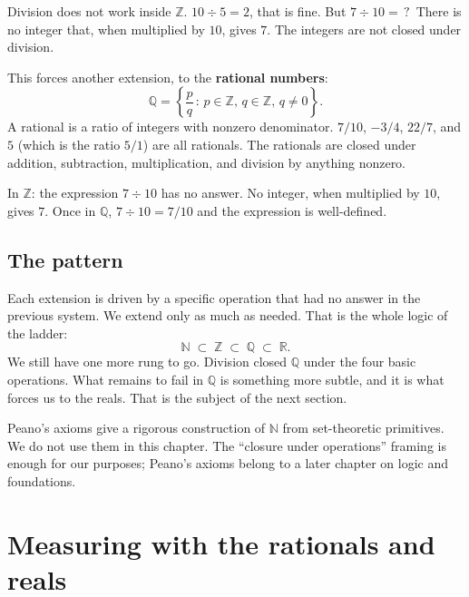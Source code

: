 Division does not work inside $\mathbb{Z}$. $10 \div 5 = 2$, that is fine. But $7 \div 10 = \,?\,$ There is no integer that, when multiplied by $10$, gives $7$. The integers are not closed under division.

This forces another extension, to the \textbf{rational numbers}:
\[
  \mathbb{Q} = \left\{\frac{p}{q} \,:\, p \in \mathbb{Z},\, q \in \mathbb{Z},\, q \neq 0\right\}.
\]
A rational is a ratio of integers with nonzero denominator. $7/10$, $-3/4$, $22/7$, and $5$ (which is the ratio $5/1$) are all rationals. The rationals are closed under addition, subtraction, multiplication, and division by anything nonzero.

\begin{example}
In $\mathbb{Z}$: the expression $7 \div 10$ has no answer. No integer, when multiplied by $10$, gives $7$. Once in $\mathbb{Q}$, $7 \div 10 = 7/10$ and the expression is well-defined.
\end{example}

\subsection*{The pattern}

Each extension is driven by a specific operation that had no answer in the previous system. We extend only as much as needed. That is the whole logic of the ladder:
\[
  \mathbb{N} \;\subset\; \mathbb{Z} \;\subset\; \mathbb{Q} \;\subset\; \mathbb{R}.
\]
We still have one more rung to go. Division closed $\mathbb{Q}$ under the four basic operations. What remains to fail in $\mathbb{Q}$ is something more subtle, and it is what forces us to the reals. That is the subject of the next section.

\begin{remark}
Peano's axioms give a rigorous construction of $\mathbb{N}$ from set-theoretic primitives. We do not use them in this chapter. The ``closure under operations'' framing is enough for our purposes; Peano's axioms belong to a later chapter on logic and foundations.
\end{remark}


\section{Measuring with the rationals and reals}

